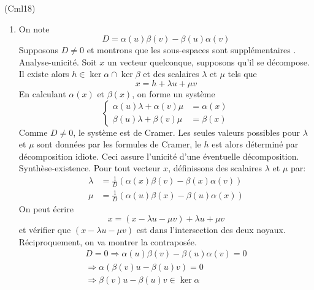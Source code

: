 \begin{tiny}(Cml18)\end{tiny}
\begin{enumerate}
  \item On note
\begin{displaymath}
  D =\alpha(u)\beta(v) - \beta(u)\alpha(v)
\end{displaymath}
Supposons $D\neq 0$  et montrons que les sous-espaces sont supplémentaires .\newline
Analyse-unicité. Soit $x$ un vecteur quelconque, supposons qu'il se décompose. Il existe alors $h\in \ker \alpha \cap \ker \beta$ et des scalaires $\lambda$ et $\mu$ tels que 
\begin{displaymath}
  x = h + \lambda u + \mu v
\end{displaymath}
En calculant $\alpha(x)$ et $\beta(x)$, on forme un système
\begin{displaymath}
\left\lbrace  
  \begin{aligned}
    \alpha(u)\lambda + \alpha(v) \mu &= \alpha(x) \\
    \beta(u) \lambda + \beta(v) \mu &= \beta(x)
  \end{aligned}
\right. 
\end{displaymath}
Comme $D\neq0$, le système est de Cramer. Les seules valeurs possibles pour $\lambda$ et $\mu$ sont données par les formules de Cramer, le $h$ est alors déterminé par décomposition idiote. Ceci assure l'unicité d'une éventuelle décomposition.\newline
Synthèse-existence. Pour tout vecteur $x$, définissons des scalaires $\lambda$ et $\mu$ par:
\begin{align*}
  \lambda &= \frac{1}{D}(\alpha(x)\beta(v)-\beta(x)\alpha(v)) \\
  \mu &= \frac{1}{D}(\alpha(u)\beta(x)-\beta(u)\alpha(x)) 
\end{align*}
On peut écrire
\begin{displaymath}
  x = (x-\lambda u - \mu v) + \lambda u + \mu v
\end{displaymath}
et vérifier que $(x-\lambda u - \mu v)$ est dans l'intersection des deux noyaux.\newline
Réciproquement, on va montrer la contraposée.
\begin{multline*}
  D=0 \Rightarrow \alpha(u)\beta(v) - \beta(u)\alpha(v) = 0 \\
\Rightarrow \alpha\left( \beta(v)u-\beta(u)v\right) = 0\\
\Rightarrow \beta(v)u-\beta(u)v \in \ker \alpha
\end{multline*}


\end{enumerate}
